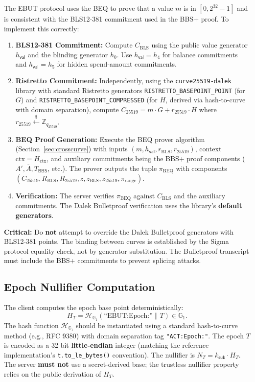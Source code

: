 \documentclass[11pt]{article}
\theoremstyle{definitionstyle}
\theoremstyle{plain}
\begin{document}
The EBUT protocol uses the BEQ to prove that a value $m$ is in $[0,2^{32}-1]$ and is consistent with the BLS12-381 commitment used in the BBS+ proof. To implement this correctly:

\begin{enumerate}[leftmargin=*]
\item \textbf{BLS12-381 Commitment:} Compute $C_{\text{BLS}}$ using the public value generator $h_{\mathsf{val}}$ and the blinding generator $h_0$. Use $h_{\mathsf{val}} = h_4$ for balance commitments and $h_{\mathsf{val}} = h_5$ for hidden spend-amount commitments.
\item \textbf{Ristretto Commitment:} Independently, using the \nolinkurl{curve25519-dalek} library with standard Ristretto generators \nolinkurl{RISTRETTO_BASEPOINT_POINT} (for $G$) and \nolinkurl{RISTRETTO_BASEPOINT_COMPRESSED} (for $H$, derived via hash-to-curve with domain separation), compute $C_{25519} = m \cdot G + r_{25519} \cdot H$ where $r_{25519} \xleftarrow{\$} \mathbb{Z}_{q_{25519}}$.
\item \textbf{BEQ Proof Generation:} Execute the BEQ prover algorithm (Section~\ref{sec:crosscurve}) with inputs $(m, h_{\mathsf{val}}, r_{\text{BLS}}, r_{25519})$, context $\text{ctx} = H_{\text{ctx}}$, and auxiliary commitments being the BBS+ proof components ($A', \bar{A}, T_{\mathsf{BBS}}$, etc.). The prover outputs the tuple $\pi_{\text{BEQ}}$ with components $(C_{25519}, R_{\text{BLS}}, R_{25519}, z, z_{\text{BLS}}, z_{25519}, \pi_{\text{range}})$.
\item \textbf{Verification:} The server verifies $\pi_{\text{BEQ}}$ against $C_{\text{BLS}}$ and the auxiliary commitments. The Dalek Bulletproof verification uses the library's \textbf{default generators}.
\end{enumerate}

\textbf{Critical:} Do \textbf{not} attempt to override the Dalek Bulletproof generators with BLS12-381 points. The binding between curves is established by the Sigma protocol equality check, not by generator substitution. The Bulletproof transcript must include the BBS+ commitments to prevent splicing attacks.

\subsection{Epoch Nullifier Computation}

The client computes the epoch base point deterministically:
\[
H_T = \mathcal{H}_{\mathbb{G}_1}(\text{``EBUT:Epoch:''} \parallel T) \in \mathbb{G}_1.
\]
The hash function $\mathcal{H}_{\mathbb{G}_1}$ should be instantiated using a standard hash-to-curve method (e.g., RFC 9380) with domain separation tag \texttt{"ACT:Epoch:"}. The epoch $T$ is encoded as a 32-bit \textbf{little-endian} integer (matching the reference implementation's \texttt{t.to\_le\_bytes()} convention). The nullifier is $N_T = k_{\mathsf{sub}} \cdot H_T$. The server \textbf{must not} use a secret-derived base; the trustless nullifier property relies on the public derivation of $H_T$.
\end{document}
